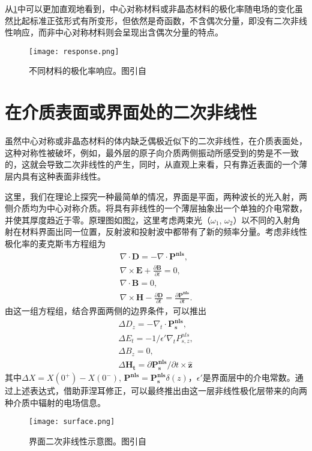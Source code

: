 从\ref{pic:response}中可以更加直观地看到，中心对称材料或非晶态材料的极化率随电场的变化虽然比起标准正弦形式有所变形，但依然是奇函数，不含偶次分量，即没有二次非线性响应，而非中心对称材料则会呈现出含偶次分量的特点。

\begin{figure}
\centering
\texttt{[image: response.png]}
\caption{不同材料的极化率响应。图引自\cite{boyd2003nonlinear}}
\label{pic:response}
\end{figure}

\section{在介质表面或界面处的二次非线性}
虽然中心对称或非晶态材料的体内缺乏偶极近似下的二次非线性，在介质表面处，这种对称性被破坏，例如，最外层的原子向介质两侧振动所感受到的势是不一致的，这就会导致二次非线性的产生，同时，从直观上来看，只有靠近表面的一个薄层内具有这种表面非线性。

这里，我们在理论上探究一种最简单的情况，界面是平面，两种波长的光入射，两侧介质均为中心对称介质。将具有非线性的一个薄层抽象出一个单独的介电常数，并使其厚度趋近于零。原理图如图\ref{pic:surface}，这里考虑两束光（$\omega_1$, $\omega_2$）以不同的入射角射在材料界面出同一位置，反射波和投射波中都带有了新的频率分量。考虑非线性极化率的麦克斯韦方程组为
\begin{gather}
\nabla \cdot \mathbf{D}  = -\nabla \cdot \mathbf{P^{nls}} , \\
\nabla \times \mathbf{E }	+ \frac{\partial\mathbf{B} }{\partial t} = 0, \\
\nabla \cdot \mathbf{B} = 0, \\
\nabla \times \mathbf{H} - \frac{\partial \mathbf{D}}{\partial t} = \frac{\partial \mathbf{P^{nls}}}{\partial t}.
\end{gather}
由这一组方程组，结合界面两侧的边界条件，可以推出\cite{heinz1991second}
\begin{gather}
\Delta D_z = -\nabla_t \cdot \mathbf{P_s^{nls}}, \\
\Delta E_t = -1/\epsilon' \nabla_t P_{s,z}^{nls}, \\
\Delta B_z = 0, \\
\Delta \mathbf{H_t} = \partial \mathbf{P_s^{nls}}/\partial t \times \mathbf{\hat z} 
\end{gather}
其中$\Delta X = X(0^+)-X(0^-)$, $\mathbf{P^{nls}}  = \mathbf{P_s^{nls}}\delta(z)$，$\epsilon'$是界面层中的介电常数。通过上述表达式，借助菲涅耳修正，可以最终推出由这一层非线性极化层带来的向两种介质中辐射的电场信息\cite{heinz1991second}。
\begin{figure}
\centering
\texttt{[image: surface.png]}
\caption{界面二次非线性示意图。图引自\cite{heinz1991second}}
\label{pic:surface}
\end{figure}

